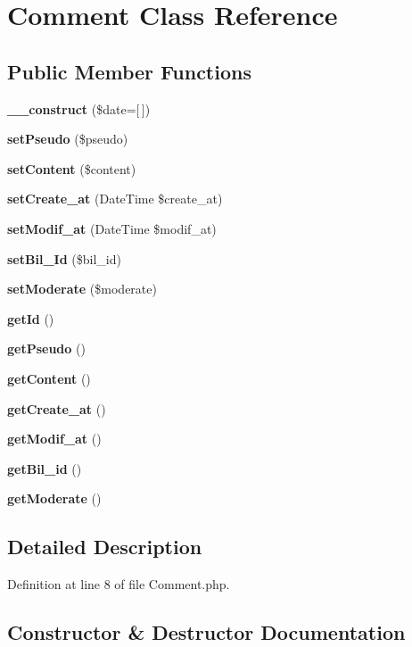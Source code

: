 \section{Comment Class Reference}
\label{class_src_1_1_entity_1_1_comment}
\subsection*{Public Member Functions}
\begin{DoxyCompactItemize}
\item 
\textbf{ \+\_\+\+\_\+construct} (\$date=[$\,$])
\item 
\textbf{ set\+Pseudo} (\$pseudo)
\item 
\textbf{ set\+Content} (\$content)
\item 
\textbf{ set\+Create\+\_\+at} (Date\+Time \$create\+\_\+at)
\item 
\textbf{ set\+Modif\+\_\+at} (Date\+Time \$modif\+\_\+at)
\item 
\textbf{ set\+Bil\+\_\+\+Id} (\$bil\+\_\+id)
\item 
\textbf{ set\+Moderate} (\$moderate)
\item 
\textbf{ get\+Id} ()
\item 
\textbf{ get\+Pseudo} ()
\item 
\textbf{ get\+Content} ()
\item 
\textbf{ get\+Create\+\_\+at} ()
\item 
\textbf{ get\+Modif\+\_\+at} ()
\item 
\textbf{ get\+Bil\+\_\+id} ()
\item 
\textbf{ get\+Moderate} ()
\end{DoxyCompactItemize}


\subsection{Detailed Description}


Definition at line 8 of file Comment.\+php.



\subsection{Constructor \& Destructor Documentation}
\mbox{\label{class_src_1_1_entity_1_1_comment_a594620c0e8c7693172eee4901c0b7705}} 
